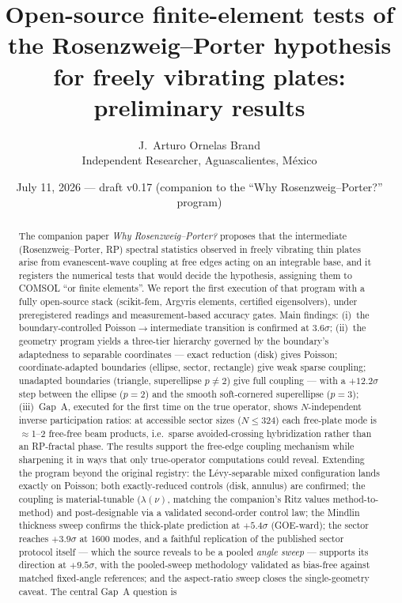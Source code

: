\documentclass[11pt]{article}
\title{Open-source finite-element tests of the Rosenzweig--Porter hypothesis
for freely vibrating plates:\\ preliminary results}
\author{J.~Arturo Ornelas Brand\\
\small Independent Researcher, Aguascalientes, M\'exico}
\date{July 11, 2026 --- draft v0.17 (companion to the ``Why Rosenzweig--Porter?'' program)}
\begin{document}
\maketitle

\begin{abstract}
The companion paper \emph{Why Rosenzweig--Porter?} proposes that the
intermediate (Rosenzweig--Porter, RP) spectral statistics observed in freely
vibrating thin plates arise from evanescent-wave coupling at free edges
acting on an integrable base, and it registers the numerical tests that would
decide the hypothesis, assigning them to COMSOL ``or finite elements''. We
report the first execution of that program with a fully open-source stack
(scikit-fem, Argyris elements, certified eigensolvers), under preregistered
readings and measurement-based accuracy gates. Main findings: (i)~the
boundary-controlled Poisson$\to$intermediate transition is confirmed at
$3.6\sigma$; (ii)~the geometry program yields a three-tier hierarchy governed
by the boundary's adaptedness to separable coordinates --- exact reduction
(disk) gives Poisson; coordinate-adapted boundaries (ellipse, sector,
rectangle) give weak sparse coupling; unadapted boundaries (triangle,
superellipse $p\neq2$) give full coupling --- with a $+12.2\sigma$ step
between the ellipse ($p=2$) and the smooth soft-cornered superellipse
($p=3$); (iii)~Gap~A, executed for the first time on the true operator,
shows $N$-independent inverse participation ratios: at accessible sector
sizes ($N\le324$) each free-plate mode is $\approx$1--2 free-free beam
products, i.e.\ sparse avoided-crossing hybridization rather than an
RP-fractal phase. The results support the free-edge coupling mechanism while
sharpening it in ways that only true-operator computations could reveal.
Extending the program beyond the original registry: the L\'evy-separable
mixed configuration lands exactly on Poisson; both exactly-reduced controls
(disk, annulus) are confirmed; the coupling is material-tunable
($\lambda(\nu)$, matching the companion's Ritz values method-to-method) and
post-designable via a validated second-order control law; the Mindlin
thickness sweep confirms the thick-plate prediction at $+5.4\sigma$
(GOE-ward); the sector reaches $+3.9\sigma$ at 1600 modes, and a faithful
replication of the published sector protocol itself --- which the source
reveals to be a pooled \emph{angle sweep} --- supports its direction at
$+9.5\sigma$, with the pooled-sweep methodology validated as bias-free
against matched fixed-angle references; and the aspect-ratio sweep
closes the single-geometry caveat. The central Gap~A question is

\end{abstract}
\end{document}
